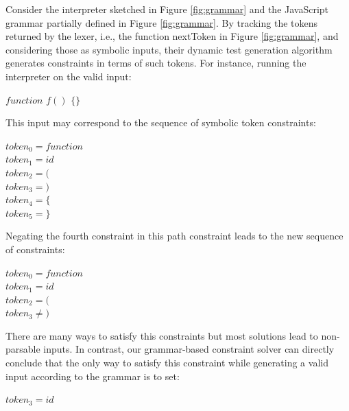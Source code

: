
Consider the interpreter sketched in Figure \ref{fig:grammar} and the JavaScript grammar partially defined in Figure \ref{fig:grammar}. By tracking the tokens returned by the lexer, i.e., the function nextToken in Figure \ref{fig:grammar}, and considering those as symbolic inputs, their dynamic test generation algorithm generates constraints in terms of such tokens. For instance, running the interpreter on the valid input:

\begin{center}
$function$  $f()$ $\{\}$
\end{center}

This input may correspond to the sequence of symbolic token constraints:

\begin{center}

$token_0 = function$ \\
$token_1 = id$ \\
$token_2 = ($ \\
$token_3 = )$ \\
$token_4 = \{$ \\
$token_5 = \}$

\end{center}


Negating the fourth constraint in this path constraint leads to the new sequence of constraints:
\begin{center}

$token_0 = function$ \\
$token_1 = id$ \\
$token_2 = ($ \\
$token_3 \neq )$ 

\end{center}

There are many ways to satisfy this constraints but most solutions lead to non-parsable inputs. In contrast, our grammar-based constraint solver can directly conclude that the only way to satisfy this constraint while generating a valid input according to the grammar is to set:

\begin{center}

$token_3 = id$ 

\end{center}

